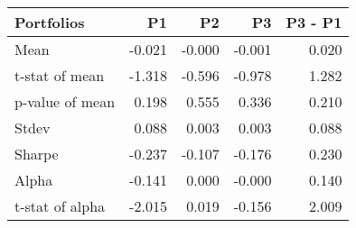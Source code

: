 \begin{tabular}{lrrrr}
\toprule
Portfolios & P1 & P2 & P3 & P3 - P1 \\
\midrule
Mean & -0.021 & -0.000 & -0.001 & 0.020 \\
t-stat of mean & -1.318 & -0.596 & -0.978 & 1.282 \\
p-value of mean & 0.198 & 0.555 & 0.336 & 0.210 \\
Stdev & 0.088 & 0.003 & 0.003 & 0.088 \\
Sharpe & -0.237 & -0.107 & -0.176 & 0.230 \\
Alpha & -0.141 & 0.000 & -0.000 & 0.140 \\
t-stat of alpha & -2.015 & 0.019 & -0.156 & 2.009 \\
\bottomrule
\end{tabular}
